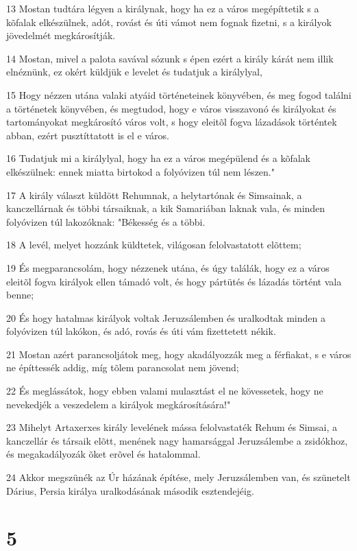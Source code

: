 \par 13 Mostan tudtára légyen a királynak, hogy ha ez a város megépíttetik s a kõfalak elkészülnek, adót, rovást és úti vámot nem fognak fizetni, s a királyok jövedelmét megkárosítják.
\par 14 Mostan, mivel a palota savával sózunk s épen ezért a király kárát nem illik elnéznünk, ez okért küldjük e levelet és tudatjuk a királylyal,
\par 15 Hogy nézzen utána valaki atyáid történeteinek könyvében, és meg fogod találni a történetek könyvében, és megtudod, hogy e város visszavonó és királyokat és tartományokat megkárosító város volt, s hogy eleitõl fogva lázadások történtek abban, ezért pusztíttatott is el e város.
\par 16 Tudatjuk mi a királylyal, hogy ha ez a város megépülend és a kõfalak elkészülnek: ennek miatta birtokod a folyóvizen túl nem lészen."
\par 17 A király választ küldött Rehumnak, a helytartónak és Simsainak, a kanczellárnak és többi társaiknak, a kik Samariában laknak vala, és minden folyóvizen túl lakozóknak: "Békesség és a többi.
\par 18 A levél, melyet hozzánk küldtetek, világosan felolvastatott elõttem;
\par 19 És megparancsolám, hogy nézzenek utána, és úgy találák, hogy ez a város eleitõl fogva királyok ellen támadó volt, és hogy pártütés és lázadás történt vala benne;
\par 20 És hogy hatalmas királyok voltak Jeruzsálemben és uralkodtak minden a folyóvizen túl lakókon, és adó, rovás és úti vám fizettetett nékik.
\par 21 Mostan azért parancsoljátok meg, hogy akadályozzák meg a férfiakat, s e város ne építtessék addig, míg tõlem parancsolat nem jövend;
\par 22 És meglássátok, hogy ebben valami mulasztást el ne kövessetek, hogy ne nevekedjék a veszedelem a királyok megkárosítására!"
\par 23 Mihelyt Artaxerxes király levelének mássa felolvastaték Rehum és Simsai, a kanczellár és társaik elõtt, menének nagy hamarsággal Jeruzsálembe a zsidókhoz, és megakadályozák õket erõvel és hatalommal.
\par 24 Akkor megszünék az Úr házának építése, mely Jeruzsálemben van, és szünetelt Dárius, Persia királya uralkodásának második esztendejéig.

\chapter{5}

